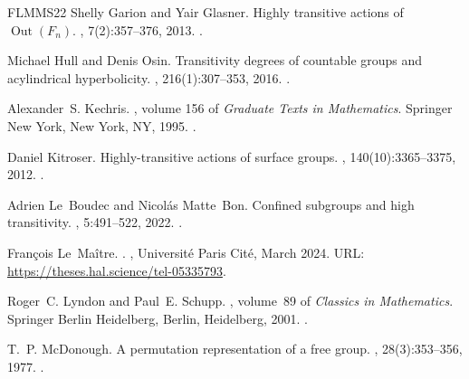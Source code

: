 \documentclass[12pt]{article}
\numberwithin{equation}{section}
\theoremstyle{definition}
\begin{document}
\begin{thebibliography}{FLMMS22}
Shelly Garion and Yair Glasner.
\newblock Highly transitive actions of $\operatorname{Out}({F}_n)$.
, 7(2):357--376, 2013.
\newblock \href {https://doi.org/10.4171/ggd/185} {}.

Michael Hull and Denis Osin.
\newblock Transitivity degrees of countable groups and acylindrical
  hyperbolicity.
, 216(1):307--353, 2016.
\newblock \href {https://doi.org/10.1007/s11856-016-1411-9}
  {}.

Alexander~S. Kechris.
, volume 156 of {\em
  Graduate {Texts} in {Mathematics}}.
\newblock Springer New York, New York, NY, 1995.
\newblock \href {https://doi.org/10.1007/978-1-4612-4190-4}
  {}.

Daniel Kitroser.
\newblock Highly-transitive actions of surface groups.
,
  140(10):3365--3375, 2012.
\newblock \href {https://doi.org/10.1090/S0002-9939-2012-11195-5}
  {}.

Adrien Le~Boudec and Nicol{\'a}s Matte~Bon.
\newblock Confined subgroups and high transitivity.
, 5:491--522, 2022.
\newblock \href {https://doi.org/10.5802/ahl.128} {}.

François Le~Maître.
.
, Université Paris Cité, March 2024.
\newblock URL: \url{https://theses.hal.science/tel-05335793}.

Roger~C. Lyndon and Paul~E. Schupp.
, volume~89 of {\em Classics in
  {Mathematics}}.
\newblock Springer Berlin Heidelberg, Berlin, Heidelberg, 2001.
\newblock \href {https://doi.org/10.1007/978-3-642-61896-3}
  {}.

T.~P. McDonough.
\newblock A permutation representation of a free group.
, 28(3):353--356, 1977.
\newblock \href {https://doi.org/10.1093/qmath/28.3.353}
  {}.


\end{thebibliography}
\end{document}
